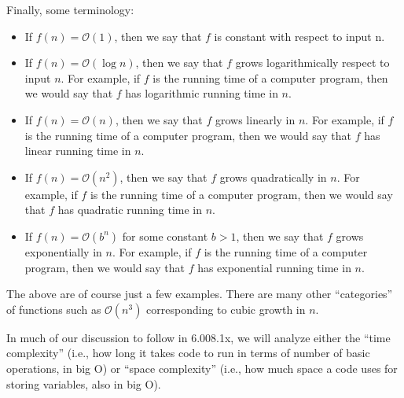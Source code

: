 \documentclass[6008notes.tex]{subfiles}
\begin{document}
Finally, some terminology:

\begin{itemize}
\item If $f(n) = \mathcal{O}(1)$, then we say that $f$ is constant with respect to input n.

\item If $f(n) = \mathcal{O}(\log n)$, then we say that $f$ grows logarithmically respect to input $n$. For example, if $f$ is the running time of a computer program, then we would say that $f$ has logarithmic running time in $n$.

\item If $f(n) = \mathcal{O}(n)$, then we say that $f$ grows linearly in $n$. For example, if $f$ is the running time of a computer program, then we would say that $f$ has linear running time in $n$.

\item If $f(n) = \mathcal{O}(n^2)$, then we say that $f$ grows quadratically in $n$. For example, if $f$ is the running time of a computer program, then we would say that $f$ has quadratic running time in $n$.

\item If $f(n) = \mathcal{O}(b^n)$ for some constant $b>1$, then we say that $f$ grows exponentially in $n$. For example, if $f$ is the running time of a computer program, then we would say that $f$ has exponential running time in $n$.
\end{itemize}

The above are of course just a few examples. There are many other ``categories'' of functions such as $\mathcal{O}(n^3)$ corresponding to cubic growth in $n$.

In much of our discussion to follow in 6.008.1x, we will analyze either the ``time complexity'' (i.e., how long it takes code to run in terms of number of basic operations, in big O) or ``space complexity'' (i.e., how much space a code uses for storing variables, also in big O).
\end{document}
